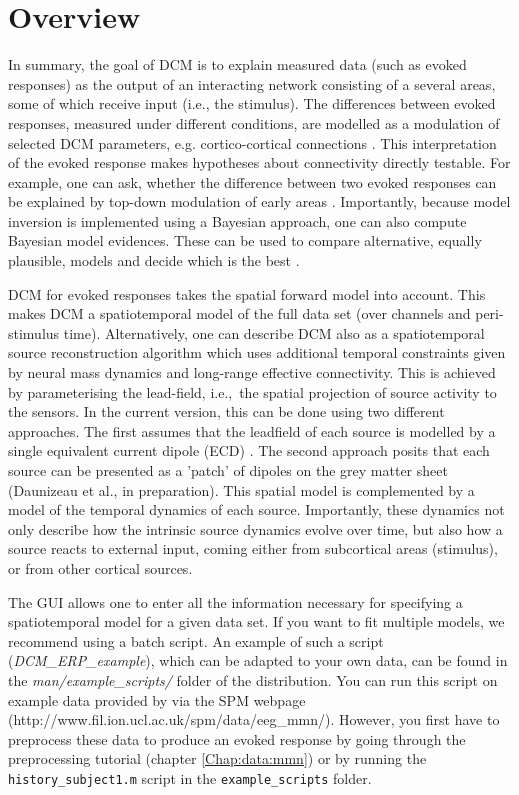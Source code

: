 \section{Overview}
In summary, the goal of DCM is to explain measured data (such as evoked
responses) as the output of an interacting network consisting of a several
areas, some of which receive input (i.e., the stimulus). The differences between
evoked responses, measured under different conditions, are modelled as
a modulation of selected DCM parameters, e.g. cortico-cortical
connections \cite{od_dcm_erp}. This interpretation of the evoked
response makes hypotheses about connectivity directly testable. For
example, one can ask, whether the difference between two
evoked responses can be explained by top-down modulation of early areas
\cite{mg_dcm_repro}. Importantly, because model inversion is implemented
using a Bayesian approach, one can also compute Bayesian model evidences. These
can be used to compare alternative, equally plausible, models and
decide which is the best \cite{stefan_neurodynamics}.

DCM for evoked responses takes the spatial forward model into
account. This makes DCM a spatiotemporal model of the full data set
(over channels and peri-stimulus time). Alternatively, one can
describe DCM also as a spatiotemporal source reconstruction algorithm which uses
additional temporal constraints given by neural mass dynamics and
long-range effective connectivity. This is achieved by parameterising
the lead-field, i.e.,~the spatial projection of source
activity to the sensors. In the current version, this can be done
using two different approaches. The first assumes that the leadfield
of each source is modelled by a single equivalent current dipole
(ECD) \cite{sjk_dcm_erp}. The second approach posits that each source
can be presented as a 'patch' of dipoles on the grey matter sheet
(Daunizeau et al., in preparation). This spatial model is complemented
by a model of the temporal dynamics of each source. Importantly, these
dynamics not only describe how the intrinsic source dynamics evolve
over time, but also how a source reacts to external input, coming
either from subcortical areas (stimulus), or from other cortical
sources.

The GUI allows one to enter all the information necessary for specifying a
spatiotemporal model for a given data set. If you want to fit multiple
models, we recommend using a batch script. An example of such
a script (\textit{DCM\_ERP\_example}), which can be adapted to your
own data, can be found in the \textit{man/example\_scripts/} folder of
the distribution. You can run this script on example data provided by via the SPM webpage (http://www.fil.ion.ucl.ac.uk/spm/data/eeg\_mmn/). However, you first have to preprocess these data to produce an evoked response by going through the preprocessing tutorial (chapter \ref{Chap:data:mmn}) or by running the \texttt{history\_subject1.m} script in the \texttt{example\_scripts} folder.

